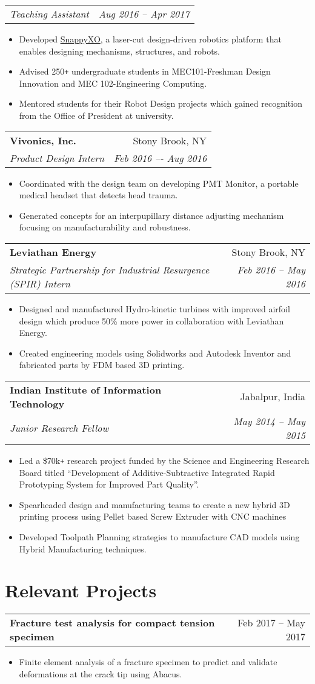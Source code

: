 \documentclass[letterpaper,10pt]{article}
\makeatletter
\newcommand{\resumeHeading}[4]{
  \vspace{-1pt}
    \begin{tabular*}{0.97\textwidth}{l@{\extracolsep{\fill}}r}
      \textbf{#1} & #2 \vspace{-2pt}\\ \vspace{1pt}
      \textit{\small#3} & \textit{\small #4} \\
    \end{tabular*}
}
\newcommand{\resumeSubheadingWithDate}[2]{
    \begin{tabular*}{0.97\textwidth}{l@{\extracolsep{\fill}}r}
      \textit{\small#1} & \textit{\small #2}\\
    \end{tabular*}
    \vspace{+2pt}
}
\newcommand{\resumeHeadingwithDate}[2]{
	\vspace{-1pt}
	\begin{tabular*}{0.97\textwidth}{l@{\extracolsep{\fill}}r}
		\textbf{#1} & #2 \vspace{-2pt}\\
	\end{tabular*}
	\vspace{+2pt}
}
\newcommand{\resumeSection}[1]{
\vspace{-12pt}
\section{\textbf{#1}}
}
\newcommand{\resumeItemListStart}{
\vspace{-7pt}
\begin{itemize}[leftmargin=14pt]
}
\newcommand{\resumeItemListEnd}{
\vspace{+7pt}
\end{itemize}
}
\newcommand{\resumeItem}[1]{
  \item\small{
      {#1 \vspace{-7pt}
      }
  }
}
\makeatother
\begin{document}
    \vspace{-5pt}
    \resumeSubheadingWithDate{Teaching Assistant}{Aug 2016 -- Apr 2017}
    \resumeItemListStart
    \resumeItem{Developed \href{http://snappyxo.com/}{SnappyXO}, a laser-cut design-driven robotics platform that enables designing mechanisms, structures, and robots.}
    \resumeItem{Advised 250\texttt{+} undergraduate students in MEC101-Freshman Design Innovation and MEC 102-Engineering Computing.}
    \resumeItem{Mentored students for their Robot Design projects which gained recognition from the Office of President at university.}
    \resumeItemListEnd
    
    \vspace{-3pt}
    \resumeHeading
    {Vivonics, Inc.}{Stony Brook, NY}
    {Product Design Intern}{Feb 2016 –- Aug 2016}
    \resumeItemListStart
    \resumeItem{Coordinated with the design team on developing PMT Monitor, a portable medical headset that detects head trauma.}
    \resumeItem{Generated concepts for an interpupillary distance adjusting mechanism focusing on manufacturability and robustness.}
    \resumeItemListEnd
    
    \vspace{-3pt}
    \resumeHeading
    {Leviathan Energy}{Stony Brook, NY}
    {Strategic Partnership for Industrial Resurgence (SPIR) Intern}{Feb 2016 – May 2016}
    \resumeItemListStart
    \resumeItem{Designed and manufactured Hydro-kinetic turbines with improved airfoil design which produce 50\% more power in collaboration with Leviathan Energy.}
    \resumeItem{Created engineering models using Solidworks and Autodesk Inventor and fabricated parts by FDM based 3D printing.}
    \resumeItemListEnd
    
    \vspace{-3pt}
    \resumeHeading
    {Indian Institute of Information Technology}{Jabalpur, India}
    {Junior Research Fellow}{May 2014 -- May 2015}
    \resumeItemListStart
    \resumeItem{Led a \$70k\texttt{+} research project funded by the Science and Engineering Research Board titled “Development of Additive-Subtractive Integrated Rapid Prototyping System for Improved Part Quality”.}
    \resumeItem{Spearheaded design and manufacturing teams to create a new hybrid 3D printing process using Pellet based Screw Extruder with CNC machines}
    \resumeItem{Developed Toolpath Planning strategies to manufacture CAD models using Hybrid Manufacturing techniques.}
    \resumeItemListEnd



\resumeSection{Relevant Projects}
    \resumeHeadingwithDate{Fracture test analysis for compact tension specimen}{Feb 2017 -- May 2017}
    \resumeItemListStart
    \resumeItem{Finite element analysis of a fracture specimen to predict and validate deformations at the crack tip using Abacus.}
    \resumeItemListEnd
    
\end{document}

